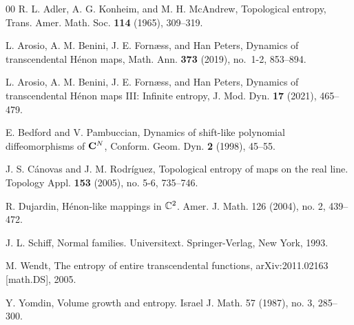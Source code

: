 \documentclass[12pt, reqno]{amsart}
\numberwithin{equation}{section}
\theoremstyle{definition}
\theoremstyle{remark}
\theoremstyle{plain}
\theoremstyle{definition}
\numberwithin{equation}{section}
\begin{document}
\begin{thebibliography}{00}
 R. L. Adler, A. G. Konheim, and M. H. McAndrew,  Topological entropy, Trans. Amer. Math. Soc. {\bf 114} (1965), 309--319.

 L. Arosio, A. M. Benini, J. E. Forn\ae ss, and Han Peters, Dynamics of transcendental H\'{e}non maps, Math. Ann. {\bf 373} (2019), no.~1-2, 853--894.

 L. Arosio, A. M. Benini, J. E. Forn\ae ss, and Han Peters, Dynamics of transcendental H\'{e}non maps III: Infinite entropy, J. Mod. Dyn. {\bf 17} (2021), 465--479.

 E. Bedford and V. Pambuccian, Dynamics of shift-like polynomial diffeomorphisms of ${\bf C}^N$, Conform. Geom. Dyn. {\bf 2} (1998), 45--55.

 J. S. C\'{a}novas and J. M.  Rodr\'{i}guez, Topological entropy of maps on the real line. Topology Appl. {\bf 153} (2005), no. 5-6, 735--746.

 R. Dujardin, Hénon-like mappings in $\Bbb C^2$. Amer. J. Math. 126 (2004), no. 2, 439--472.

 J. L. Schiff, Normal families. Universitext. Springer-Verlag, New York, 1993.

 M. Wendt, The entropy of entire transcendental functions, arXiv:2011.02163 [math.DS], 2005.

 Y. Yomdin, Volume growth and entropy. Israel J. Math. 57 (1987), no. 3, 285--300.
\end{thebibliography}
\end{document}
